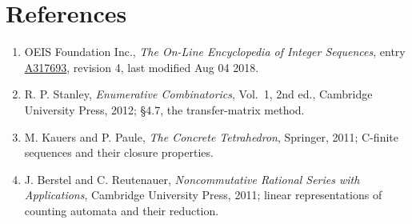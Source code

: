 \documentclass[11pt]{article}
\theoremstyle{definition}
\begin{document}
\section{References}

\begin{enumerate}

\item OEIS Foundation Inc., \emph{The On-Line Encyclopedia of Integer Sequences}, entry \href{https://oeis.org/A317693}{A317693}, revision 4, last modified Aug 04 2018.

\item R. P. Stanley, \emph{Enumerative Combinatorics}, Vol.~1, 2nd ed., Cambridge University Press, 2012; \S4.7, the transfer-matrix method.

\item M. Kauers and P. Paule, \emph{The Concrete Tetrahedron}, Springer, 2011; C-finite sequences and their closure properties.

\item J. Berstel and C. Reutenauer, \emph{Noncommutative Rational Series with Applications}, Cambridge University Press, 2011; linear representations of counting automata and their reduction.

\end{enumerate}
\end{document}
